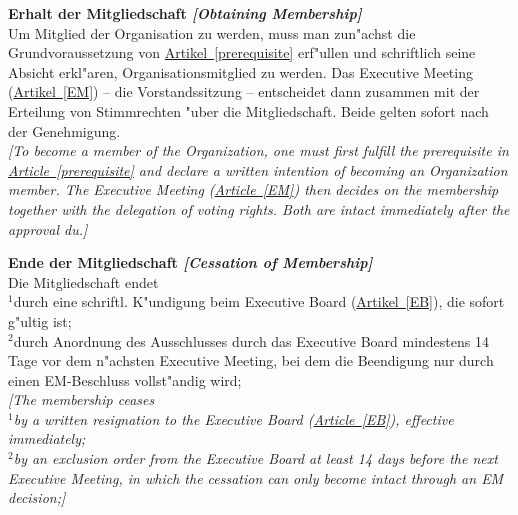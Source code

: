 \documentclass[10pt]{article}
\newcounter{qcounter}
\begin{document}
\begin{list}{{\bf Artikel :~}}{}
\item {\bf Erhalt der Mitgliedschaft {\it[Obtaining Membership]}}\\
Um Mitglied der Organisation zu werden, muss man zun"achst die Grundvoraussetzung von \hyperref[prerequisite]{Artikel~\ref{prerequisite}} erf"ullen und schriftlich seine Absicht erkl"aren, Organisationsmitglied zu werden. Das Executive Meeting (\hyperref[EM]{Artikel~\ref{EM}}) – die Vorstandssitzung – entscheidet dann zusammen mit der Erteilung von Stimmrechten "uber die Mitgliedschaft. Beide gelten sofort nach der Genehmigung.\\
{\it[To become a member of the Organization, one must first fulfill the prerequisite in \hyperref[prerequisite]{Article~\ref{prerequisite}} and declare a written intention of becoming an Organization member. The Executive Meeting (\hyperref[EM]{Article~\ref{EM}}) then decides on the membership together with the delegation of voting rights. Both are intact immediately after the approval du.]}


\item {\bf Ende der Mitgliedschaft {\it[Cessation of Membership]}}\\ \label{cessation}
Die Mitgliedschaft endet\\
$^{1}$durch eine schriftl. K"undigung beim Executive Board (\hyperref[EB]{Artikel~\ref{EB}}), die sofort g"ultig ist;\\
$^{2}$durch Anordnung des Ausschlusses durch das Executive Board mindestens 14 Tage vor dem n"achsten Executive Meeting, bei dem die Beendigung nur durch einen EM-Beschluss vollst"andig wird;\\
{\it[The membership ceases\\ 
$^{1}$by a written resignation to the Executive Board (\hyperref[EB]{Article~\ref{EB}}), effective immediately;\\
$^{2}$by an exclusion order from the Executive Board at least 14 days before the next Executive Meeting, in which the cessation can only become intact through an EM decision;]}


\end{list}
\end{document}

